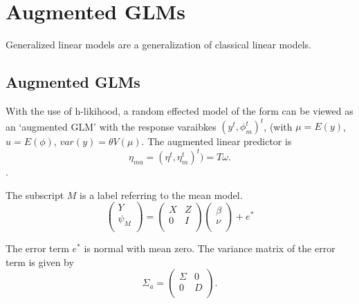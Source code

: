 \documentclass[12pt, a4paper]{report}
\theoremstyle{plain}
\theoremstyle{definition}
\theoremstyle{remark}
\begin{document}
\chapter{Augmented GLMs} 




Generalized linear models are a generalization of classical linear  models.

\section{Augmented GLMs} %

With the use of h-likihood, a random effected model of the form can be viewed as an `augmented GLM' with the response varaibkes $(y^t, \phi^t_m)^t$, (with $\mu = E(y)$,$ u = E(\phi)$, $var(y) = \theta V (\mu)$.
The augmented linear predictor is \[\eta_{ma}  = (\eta^t, \eta^t_m)^t) = T\omega. \].




The subscript $M$ is a label referring to the mean model.
\begin{equation}
\left(%
\begin{array}{c}
  Y \\
  \psi_{M} \\
\end{array}%
\right) = \left(
\begin{array}{cc}
  X & Z \\
  0 & I \\
\end{array}\right) \left(%
\begin{array}{c}
  \beta \\
  \nu \\
\end{array}%
\right)+ e^{*}
\end{equation}




The error term $e^{*}$ is normal with mean zero. The variance matrix of the error term is given by
\begin{equation}
\Sigma_{a} = \left(%
\begin{array}{cc}
  \Sigma & 0 \\
  0 & D \\
\end{array}%
\right).
\end{equation}
\end{document}
